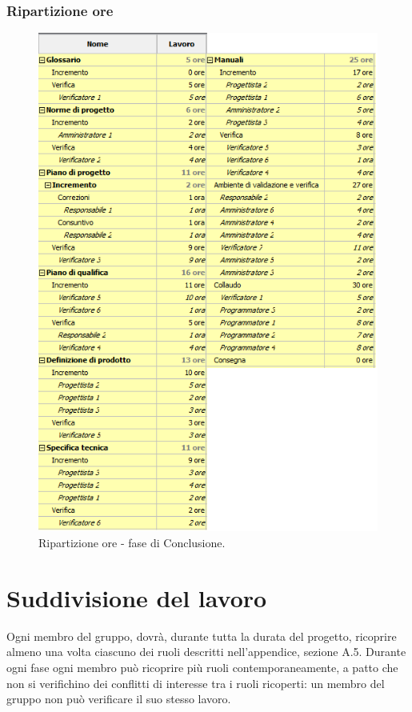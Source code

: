 \documentclass[a4paper]{article}
\begin{document}
			\subsubsection{Ripartizione ore}
				\begin{figure}[H]
					\centering
					\includegraphics[scale=0.6]{ro_conclusione}
					\caption{Ripartizione ore - fase di Conclusione.}
				\end{figure}

	\newpage 
	\section{Suddivisione del lavoro}
		Ogni membro del gruppo, dovrà, durante tutta la durata del progetto, ricoprire almeno una volta ciascuno dei
		ruoli descritti nell'appendice, sezione A.5. Durante ogni fase ogni membro può ricoprire
		più ruoli contemporaneamente, a patto che non si verifichino dei conflitti di interesse tra i ruoli ricoperti: 
		un membro del gruppo non può verificare il suo stesso lavoro.
		
\end{document}
